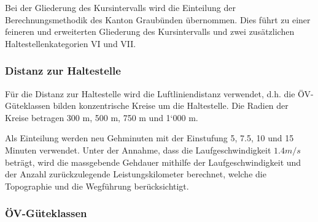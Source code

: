 Bei der Gliederung des Kursintervalls wird die Einteilung der Berechnungsmethodik des Kanton Graubünden übernommen.
Dies führt zu einer feineren und erweiterten Gliederung des Kursintervalls und zwei zusätzlichen Haltestellenkategorien VI und VII.

\subsubsection{Distanz zur Haltestelle}
\label{Zusammenhang zur Berechnungsmethodik ARE:Distanz zur Haltestelle}

\begin{itquote}
Für die Distanz zur Haltestelle wird die Luftliniendistanz verwendet, d.h. die ÖV-Güteklassen bilden konzentrische Kreise um die Haltestelle.
Die Radien der Kreise betragen 300 m, 500 m, 750 m und 1‘000 m.
\end{itquote}

Als Einteilung werden neu Gehminuten mit der Einstufung 5, 7.5, 10 und 15 Minuten verwendet.
Unter der Annahme, dass die Laufgeschwindigkeit $1.4 m/s$ beträgt, wird die massgebende Gehdauer mithilfe der Laufgeschwindigkeit und der Anzahl zurückzulegende \gls{Leistungskilometer} berechnet, welche die Topographie und die Wegführung berücksichtigt.

\subsubsection{ÖV-Güteklassen}
\label{Zusammenhang zur Berechnungsmethodik ARE:ÖV-Güteklassen}

